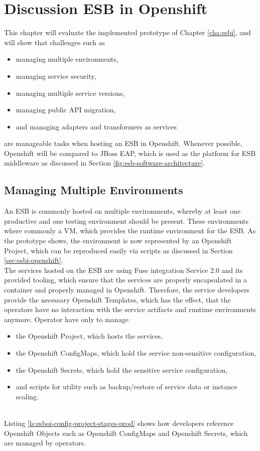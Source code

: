\chapter{Discussion ESB in Openshift}
\label{cha:esbd}
This chapter will evaluate the implemented prototype of Chapter \vref{cha:esbi}, and will show that challenges such as
\begin{itemize}
	\item managing multiple environments,
	\item managing service security,
	\item managing multiple service versions,
	\item managing public API migration,
	\item and managing adapters and transformers as services
\end{itemize}
are manageable tasks when hosting an ESB in Openshift. Whenever possible, Openshift will be compared to JBoss EAP, which is used as the platform for ESB middleware as discussed in Section \vref{fig:esb-software-architecture}.

\section{Managing Multiple Environments}
\label{sec:esbd-multiple-env}
An ESB is commonly hosted on multiple environments, whereby at least one productive and one testing environment should be present. These environments where commonly a VM, which provides the runtime environment for the ESB. As the prototype shows, the environment is now represented by an Openshift Project, which can be reproduced easily via scripts as discussed in Section \vref{sec:esbi-openshift}. \\

The services hosted on the ESB are using Fuse integration Service 2.0 and its provided tooling, which ensure that the services are properly encapsulated in a container and properly managed in Openshift. Therefore, the service developers provide the necessary Openshift Templates, which has the effect, that the operators have no interaction with the service artifacts and runtime environments anymore. Operator have only to manage
\begin{itemize}
	\item the Openshift Project, which hosts the services,
	\item the Openshift ConfigMaps, which hold the service non-sensitive configuration,
	\item the Openshift Secrets, which hold the sensitive service configuration,
	\item and scripts for utility such as backup/restore of service data or instance scaling.
\end{itemize} 
\ \\
Listing \vref{ls:esboi-config-project-stages-prod} shows how developers reference Openshift Objects such as Openshift ConfigMaps and Openshift Secrets, which are managed by operators. 

